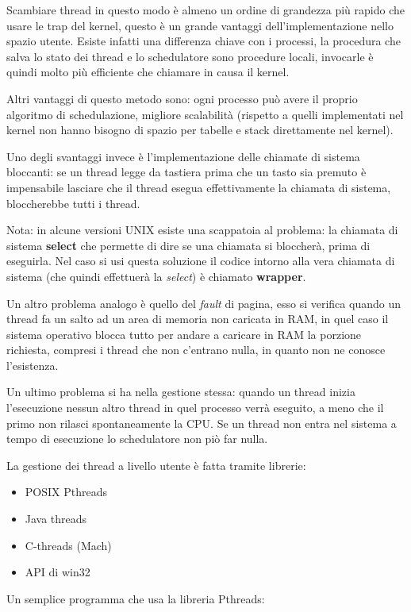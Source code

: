 Scambiare thread in questo modo è almeno un ordine di grandezza più rapido che usare le trap del kernel, questo è un grande vantaggi dell'implementazione nello spazio utente.
Esiste infatti una differenza chiave con i processi, la procedura che salva lo stato dei thread e lo schedulatore sono procedure locali, invocarle è quindi molto più efficiente che chiamare in causa il kernel.

Altri vantaggi di questo metodo sono: ogni processo può avere il proprio algoritmo di schedulazione, migliore scalabilità (rispetto a quelli implementati nel kernel non hanno bisogno di spazio per tabelle e stack direttamente nel kernel).

Uno degli svantaggi invece è l'implementazione delle chiamate di sistema bloccanti: se un thread legge da tastiera prima che un tasto sia premuto è impensabile lasciare che il thread esegua effettivamente la chiamata di sistema, bloccherebbe tutti i thread.

Nota: in alcune versioni UNIX esiste una scappatoia al problema: la chiamata di sistema \textbf{select} che permette di dire se una chiamata si bloccherà, prima di eseguirla. Nel caso si usi questa soluzione il codice intorno alla vera chiamata di sistema (che quindi effettuerà la \textit{select}) è chiamato \textbf{wrapper}.

Un altro problema analogo è quello del \textit{fault} di pagina, esso si verifica quando un thread fa un salto ad un area di memoria non caricata in RAM, in quel caso il sistema operativo blocca tutto per andare a caricare in RAM la porzione richiesta, compresi i thread che non c'entrano nulla, in quanto non ne conosce l'esistenza.

Un ultimo problema si ha nella gestione stessa: quando un thread inizia l'esecuzione nessun altro thread in quel processo verrà eseguito, a meno che il primo non rilasci spontaneamente la CPU. Se un thread non entra nel sistema a tempo di esecuzione lo schedulatore non piò far nulla.


La gestione dei thread a livello utente è fatta tramite librerie:
\begin{itemize}
    \item POSIX Pthreads
    \item Java threads
    \item C-threads (Mach)
    \item API di win32
\end{itemize}

Un semplice programma che usa la libreria Pthreads:


